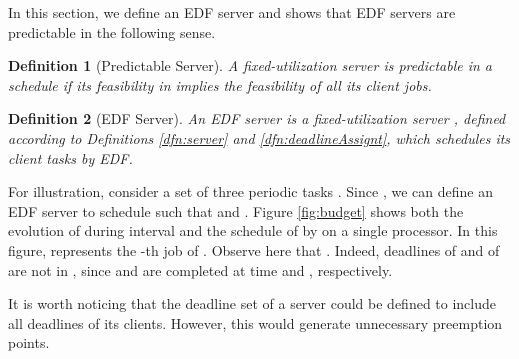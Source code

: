 \documentclass[twocolumn, compsocconf]{IEEEtran}
\newtheorem{definition}{Definition}[section]
\newcounter{proc}
\begin{document}
In this section, we define an EDF server and shows that EDF servers are
predictable in the following sense.

\begin{definition}[Predictable Server]\label{dfn:predictableServer}
  A fixed-utilization server  is predictable in a schedule  if its
  feasibility in  implies the feasibility of all its client jobs.
\end{definition}

\begin{definition}[EDF Server]\label{dfn:edfServer}
  An EDF server is a fixed-utilization server , defined according to
  Definitions \ref{dfn:server} and \ref{dfn:deadlineAssignt}, which schedules
  its client tasks by EDF.
\end{definition}

For illustration, consider a set of three periodic tasks .  Since , we can define an EDF server 
to schedule  such that  and . Figure \ref{fig:budget} shows both the evolution of  during
interval  and the schedule  of  by  on a single
processor. In this figure,  represents the -th job of . Observe
here that . Indeed, deadlines
 of  and  of  are not in , since  and  are
completed at time  and , respectively.

It is worth noticing that the deadline set of a server could be defined to
include all deadlines of its clients. However, this would generate unnecessary
preemption points.
\end{document}
